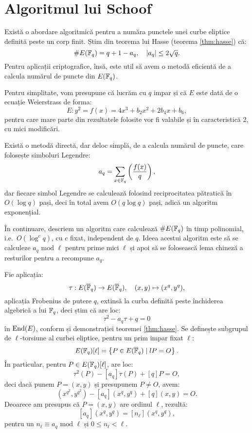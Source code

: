 
\chapter{Algoritmul lui Schoof}


Există o abordare algoritmică pentru a număra punctele unei curbe
eliptice definită peste un corp finit. Știm din teorema lui Hasse
(teorema \ref{thm:hasse}) că:
\[
    \# E(\mathbb{F}_q) = q + 1 - a_q, \quad |a_q| \leq 2 \sqrt{q}.
\]
Pentru aplicații criptografice, însă, este util să avem o metodă
eficientă de a calcula numărul de puncte din $ E(\mathbb{F}_q) $.

Pentru simplitate, vom presupune că lucrăm cu $ q $ impar și
că $ E $ este dată de o ecuație Weierstrass de forma:
\[
    E: y^2 = f(x) = 4x^3 + b_2x^2 + 2b_4x + b_6,
\]
pentru care mare parte din rezultatele folosite vor fi valabile
și în caracteristică 2, cu mici modificări.

Există o metodă directă, dar deloc simplă, de a calcula numărul de
puncte, care folosește simboluri Legendre:
\[
    a_q = \sum_{x \in \mathbb{F}_q} \left( \dfrac{f(x)}{q} \right),
\]
dar fiecare simbol Legendre se calculează folosind reciprocitatea
pătratică în $ O(\log q) $ pași, deci în total avem $ O(q \log q) $
pași, adică un algoritm exponențial.

În continuare, descriem un algoritm care calculează $ \# E(\mathbb{F}_q) $ în
timp polinomial, i.e.\ $ O(\log^c q) $, cu $ c $ fixat, independent de $ q $.
Ideea acestui algoritm este să se calculeze $ a_q \text{ mod } \ell $
pentru prime mici $ \ell $ și apoi să se folosească lema chineză a resturilor
pentru a recompune $ a_q $.

Fie aplicația:
\[
    \tau : E(\overline{\mathbb{F}}_q) \to E(\overline{\mathbb{F}}_q), \quad (x, y) \mapsto (x^q, y^q),
\]
aplicația Frobenius de putere $ q $, extinsă la curba definită peste închiderea
algebrică a lui $ \mathbb{F}_q $, deci știm că are loc:
\[
    \tau^2 - a_q \tau + q = 0
\]
în $ \mathrm{End}(E) $, conform și demonstrației teoremei \ref{thm:hasse}.
Se definește subgrupul de $ \ell $-torsiune al curbei eliptice, pentru
un prim impar fixat $ \ell $:
\[
  E(\mathbb{F}_q)[\ell] = \left\{ P \in E(\overline{\mathbb{F}}_q) \mid lP = O \right\}.
\]
În particular, pentru $ P \in E(\mathbb{F}_q)[\ell] $, are loc:
\[
    \tau^2(P) - [a_q]\tau(P) + [q]P = O,
\]
deci dacă punem $ P = (x, y) $ și presupunem $ P \neq O $, avem:
\[
    (x^{q^2}, y^{q^2}) - [a_q](x^q, y^q) + [q](x, y) = O.
\]
Deoarece am presupus că $ P = (x, y) $ are ordinul $ \ell $, rezultă:
\[
    [a_q](x^q, y^q) = [n_\ell](x^q, y^q),
\]
pentru un $ n_\ell \equiv a_q \text{ mod } \ell $ și $ 0 \leq n_\ell < \ell $.


